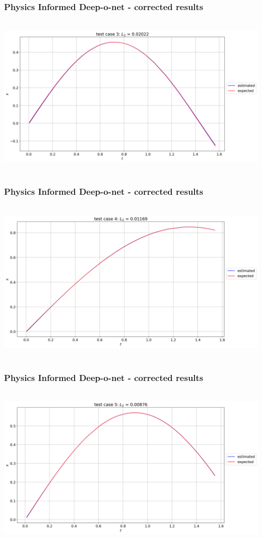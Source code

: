 \begin{frame}
    \frametitle{Physics Informed Deep-o-net - corrected results}
    \hbox{\hspace{-1cm}
        \includegraphics[scale=0.32]{supportingFiles/PI_DON_results/02_correctedOutput/test_case_3_corrected.png}\hspace{5cm}
    }
\end{frame}

\begin{frame}
    \frametitle{Physics Informed Deep-o-net - corrected results}
    \hbox{\hspace{-1cm}
        \includegraphics[scale=0.32]{supportingFiles/PI_DON_results/02_correctedOutput/test_case_4_corrected.png}\hspace{5cm}
    }
\end{frame}

\begin{frame}
    \frametitle{Physics Informed Deep-o-net - corrected results}
    \hbox{\hspace{-1cm}
        \includegraphics[scale=0.32]{supportingFiles/PI_DON_results/02_correctedOutput/test_case_5_corrected.png}\hspace{5cm}
    }
\end{frame}

